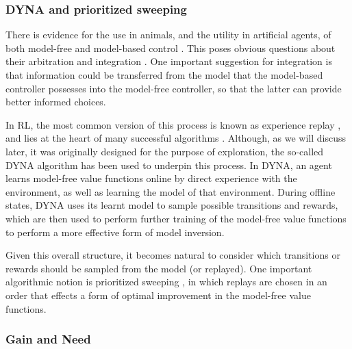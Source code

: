 
\subsubsection*{DYNA and prioritized sweeping}

There is evidence for the use in animals, and the utility in artificial agents, of both model-free and model-based control \parencite{glascherStatesRewardsDissociable2010}. This poses obvious questions about their arbitration and integration \parencite{dawUncertaintybasedCompetitionPrefrontal2005, antonovOptimismPessimismOptimised2022, agrawalTemporalDynamicsOpportunity2020}. One important suggestion for integration is that information could be transferred from the model that the model-based controller possesses into the model-free controller, so that the latter can provide better informed choices.

In RL, the most common version of this process is known as experience replay \parencite{linSelfimprovingReactiveAgents1992}, and lies at the heart of many successful algorithms \parencite{schaulPrioritizedExperienceReplay2016}. Although, as we will discuss later, it was originally designed for the purpose of exploration, the so-called DYNA algorithm \parencite{suttonDynaIntegratedArchitecture1991} has been used to underpin this process. In DYNA, an agent  learns model-free value functions online by direct experience with the environment, as well as learning the model of that environment. During offline states, DYNA uses its learnt model to sample possible transitions and rewards, which are then used to perform further training of  the model-free value functions to perform a more effective form of model inversion.

Given this overall structure, it becomes natural to consider which transitions or rewards should be sampled from the model (or replayed). One important algorithmic notion is prioritized sweeping \parencite{moorePrioritizedSweepingReinforcement1993}, in which replays are chosen in an order that effects a form of optimal improvement in the model-free value functions.


\subsubsection*{Gain and Need}

